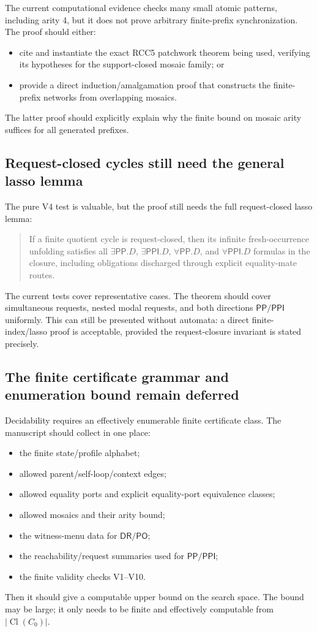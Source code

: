 \documentclass[11pt]{article}
\newcommand{\PP}{\mathsf{PP}}
\newcommand{\PPI}{\mathsf{PPI}}
\newcommand{\DR}{\mathsf{DR}}
\newcommand{\PO}{\mathsf{PO}}
\newcommand{\Cl}{\operatorname{Cl}}
\begin{document}
The current computational evidence checks many small atomic patterns, including arity 4, but it does not prove arbitrary finite-prefix synchronization.  The proof should either:
\begin{itemize}[leftmargin=2em]
  \item cite and instantiate the exact RCC5 patchwork theorem being used, verifying its hypotheses for the support-closed mosaic family; or
  \item provide a direct induction/amalgamation proof that constructs the finite-prefix networks from overlapping mosaics.
\end{itemize}
The latter proof should explicitly explain why the finite bound on mosaic arity suffices for all generated prefixes.

\subsection{Request-closed cycles still need the general lasso lemma}

The pure V4 test is valuable, but the proof still needs the full request-closed lasso lemma:

\begin{quote}
If a finite quotient cycle is request-closed, then its infinite fresh-occurrence unfolding satisfies all \(\exists\PP.D\), \(\exists\PPI.D\), \(\forall\PP.D\), and \(\forall\PPI.D\) formulas in the closure, including obligations discharged through explicit equality-mate routes.
\end{quote}

The current tests cover representative cases.  The theorem should cover simultaneous requests, nested modal requests, and both directions \(\PP/\PPI\) uniformly.  This can still be presented without automata: a direct finite-index/lasso proof is acceptable, provided the request-closure invariant is stated precisely.

\subsection{The finite certificate grammar and enumeration bound remain deferred}

Decidability requires an effectively enumerable finite certificate class.  The manuscript should collect in one place:
\begin{itemize}[leftmargin=2em]
  \item the finite state/profile alphabet;
  \item allowed parent/self-loop/context edges;
  \item allowed equality ports and explicit equality-port equivalence classes;
  \item allowed mosaics and their arity bound;
  \item the witness-menu data for \(\DR/\PO\);
  \item the reachability/request summaries used for \(\PP/\PPI\);
  \item the finite validity checks V1--V10.
\end{itemize}
Then it should give a computable upper bound on the search space.  The bound may be large; it only needs to be finite and effectively computable from \(|\Cl(C_0)|\).
\end{document}
